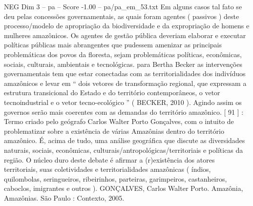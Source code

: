 \begin{textsample}{NEG Dim 3 – pa – Score -1.00 – pa/pa\_em\_53.txt}
Em alguns casos tal fato se deu pelas concessões governamentais, as quais foram agentes ( passivos ) deste processo/modelo de apropriação da biodiversidade e da expropriação de homens e mulheres amazônicos.
Os agentes de gestão pública deveriam elaborar e executar políticas públicas mais abrangentes que pudessem amenizar as principais problemáticas dos povos da floresta, sejam problemáticas políticas, econômicas, sociais, culturais, ambientais e tecnológicas. para Bertha Becker as intervenções governamentais tem que estar conectadas com as territorialidades dos indivíduos amazônicos e levar em “ dois vetores de transformação regional, que expressam a estrutura transicional do Estado e do território contemporâneos, o vetor tecnoindustrial e o vetor tecno-ecológico ” ( BECKER, 2010 ).
Agindo assim os governos serão mais coerentes com as demandas do território amazônico. [ 91 ] : Termo criado pelo geógrafo Carlos Walter Porto Gonçalves, com o intuito de problematizar sobre a existência de várias Amazônias dentro do território amazônico.
É, acima de tudo, uma análise geográfica que discute as diversidades naturais, sociais, econômicas, culturais/antropológicas/territoriais e políticas da região.
O núcleo duro deste debate é afirmar a (r)existência dos atores territoriais, suas coletividades e territorialidades amazônicas ( índios, quilombolas, seringueiros, ribeirinhos, parteiras, garimpeiros, castanheiros, caboclos, imigrantes e outros ).
GONÇALVES, Carlos Walter Porto.
Amazônia, Amazônias.
São Paulo : Contexto, 2005.

\end{textsample}
